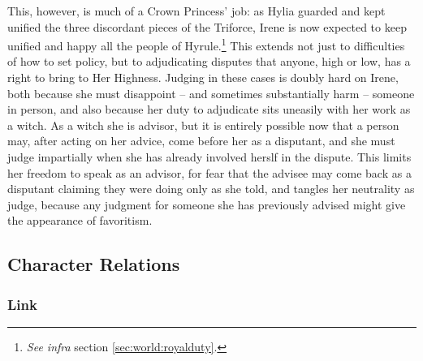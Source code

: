     This, however, is much of a Crown Princess' job: as Hylia guarded and kept unified the three discordant pieces of the Triforce, Irene is now expected to keep unified and happy all the people of Hyrule.\footnote{\textit{See infra} section \ref{sec:world:royalduty}.} This extends not just to difficulties of how to set policy, but to adjudicating disputes that anyone, high or low, has a right to bring to Her Highness. Judging in these cases is doubly hard on Irene, both because she must disappoint -- and sometimes substantially harm -- someone in person, and also because her duty to adjudicate sits uneasily with her work as a witch. As a witch she is advisor, but it is entirely possible now that a person may, after acting on her advice, come before her as a disputant, and she must judge impartially when she has already involved herslf in the dispute. This limits her freedom to speak as an advisor, for fear that the advisee may come back as a disputant claiming they were doing only as she told, and tangles her neutrality as judge, because any judgment for someone she has previously advised might give the appearance of favoritism. 
  
  \subsection{Character Relations}
  \subsubsection{Link}
